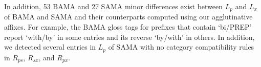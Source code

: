 In addition, 53 BAMA and 27 SAMA minor differences exist between $L_p$ and $L_x$ of BAMA and SAMA and
their counterparts computed using our agglutinative affixes. 
For example, the BAMA gloss tags for prefixes that contain
`bi/PREP' report `with/by' in some entries and its reverse `by/with' in others. 
In addition, we detected several entries in $L_p$ of SAMA with no category compatibility 
rules in $R_{ps}$, $R_{sx}$, and $R_{px}$.
